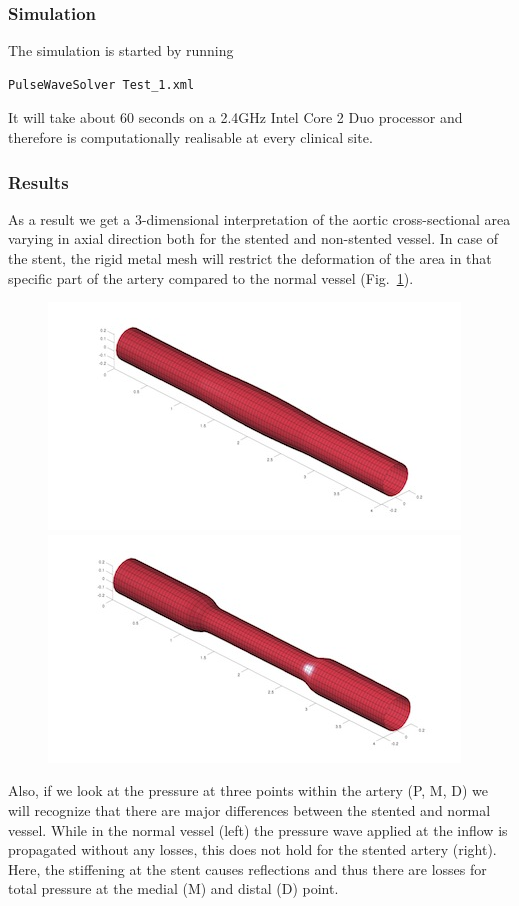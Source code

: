 \subsubsection{Simulation}
The simulation is started by running
\begin{lstlisting}[style=BashInputStyle]
PulseWaveSolver Test_1.xml
\end{lstlisting}
It will take about 60 seconds on a 2.4GHz Intel Core 2 Duo processor and 
therefore is computationally realisable at every clinical site.

\subsubsection{Results}
As a result we get a 3-dimensional interpretation of the aortic cross-sectional
area varying in axial direction both for the stented and non-stented vessel. In
case of the stent, the rigid metal mesh will restrict the deformation of the
area in that specific part of the artery compared to the normal vessel
(Fig.~\ref{f:pulsewave:stented:vessels}).

\begin{figure}
	\includegraphics[width=0.49\linewidth]{img/normal_vessel.jpg}
	\includegraphics[width=0.49\linewidth]{img/stented_vessel.jpg}
	\caption{}
	\label{f:pulsewave:stented:vessels}
\end{figure}

Also, if we look at the pressure at three points within the artery (P, M, D) we
will recognize that there are major differences between the stented and normal
vessel. While in the normal vessel (left) the pressure wave applied at the
inflow is propagated without any losses, this does not hold for the stented
artery (right). Here, the stiffening at the stent causes reflections and thus
there are losses for total pressure at the medial (M) and distal (D) point.

